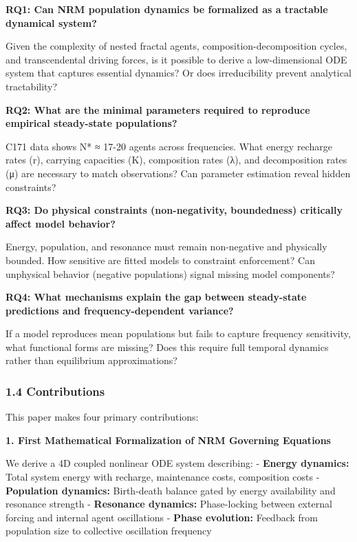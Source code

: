 \documentclass[
]{article}
\begin{document}
\textbf{RQ1: Can NRM population dynamics be formalized as a tractable
dynamical system?}

Given the complexity of nested fractal agents, composition-decomposition
cycles, and transcendental driving forces, is it possible to derive a
low-dimensional ODE system that captures essential dynamics? Or does
irreducibility prevent analytical tractability?

\textbf{RQ2: What are the minimal parameters required to reproduce
empirical steady-state populations?}

C171 data shows N* ≈ 17-20 agents across frequencies. What energy
recharge rates (r), carrying capacities (K), composition rates (λ), and
decomposition rates (μ) are necessary to match observations? Can
parameter estimation reveal hidden constraints?

\textbf{RQ3: Do physical constraints (non-negativity, boundedness)
critically affect model behavior?}

Energy, population, and resonance must remain non-negative and
physically bounded. How sensitive are fitted models to constraint
enforcement? Can unphysical behavior (negative populations) signal
missing model components?

\textbf{RQ4: What mechanisms explain the gap between steady-state
predictions and frequency-dependent variance?}

If a model reproduces mean populations but fails to capture frequency
sensitivity, what functional forms are missing? Does this require full
temporal dynamics rather than equilibrium approximations?

\subsubsection{1.4 Contributions}\label{contributions}

This paper makes four primary contributions:

\textbf{1. First Mathematical Formalization of NRM Governing Equations}

We derive a 4D coupled nonlinear ODE system describing: - \textbf{Energy
dynamics:} Total system energy with recharge, maintenance costs,
composition costs - \textbf{Population dynamics:} Birth-death balance
gated by energy availability and resonance strength - \textbf{Resonance
dynamics:} Phase-locking between external forcing and internal agent
oscillations - \textbf{Phase evolution:} Feedback from population size
to collective oscillation frequency
\end{document}
